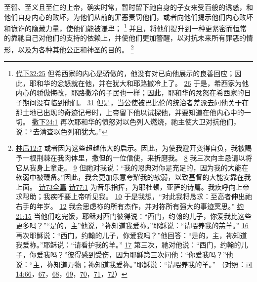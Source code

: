 \documentclass[12pt, a4paper, oneside]{ctexart}
\newcounter{parnum}[section]
\newcommand{\N}{%
   \noindent\refstepcounter{parnum}%
    \makebox[\parindent][l]{\textbf{\arabic{parnum}.}}}
\begin{document}
\N 至智、至义且至仁的上帝，确实时常，暂时留下祂自身的子女来受百般的诱惑，和他们自身内心的败坏，为他们从前的罪恶责罚他们，或者向他们揭示他们内心败坏和诡诈的隐藏力量，使他们能被谦卑；
	\footnote {
		\href{https://biblehub.com/2_chronicles/32-25.htm}{代下32:25} 但希西家的内心是骄傲的，他没有对已向他展示的良善回应；因此，耶和华的忿怒就在他，并在犹大和耶路撒冷上了。
		\href{https://biblehub.com/2_chronicles/32-26.htm}{26} 于是，希西家为他内心的骄傲悔改，耶路撒冷的子民也一样；因此，耶和华的忿怒在希西家的日子期间没有临到他们。
		\href{https://biblehub.com/2_chronicles/32-31.htm}{31} 但是，当公使被巴比伦的统治者差派去问他关于在那土地已出现的奇迹记号时，上帝留下他以试探他，并要知道在他内心中的一切。
		\href{https://biblehub.com/2_samuel/24-1.htm}{撒下24:1} 再次耶和华的愤怒对以色列人燃烧，祂主使大卫对抗他们，说：“去清查以色列和犹大。”
	}
	并且，将他们提升到一种更紧密而恒常的靠祂自己对他们的支持的依赖上，并使他们更加警醒，以对抗未来所有罪恶的情形，以及为各种其他公正和神圣的目的。
	\footnote {
		\href{https://biblehub.com/2_corinthians/12-7.htm}{林后12:7} 或者因为这些超越伟大的启示。因此，为使我避开变得自负，我被赐予一根荆棘在我肉体里，撒但的一位信使，来折磨我。
		\href{https://biblehub.com/2_corinthians/12-8.htm}{8} 我三次向主恳请以将它从我身上拿走。
		\href{https://biblehub.com/2_corinthians/12-9.htm}{9} 但祂对我说：“我的恩典对你是充足的，因为我的大能在软弱中被臻备。”因此，我会更加乐意夸耀我的软弱，以致基督的大能安靠在我上面。
		\href{https://biblehub.com/niv/psalms/73.htm}{诗73全篇}
		\href{https://biblehub.com/psalms/77-1.htm}{诗77:1} 为音乐指挥，为耶杜顿，亚萨的诗篇。我疾呼向上帝求帮助；我疾呼要上帝听见我。
		\href{https://biblehub.com/psalms/77-10.htm}{10} 于是我想，“对此我将恳求：至高者伸出祂右手的年岁。
		\href{https://biblehub.com/psalms/77-12.htm}{12} 我会思虑祢的所有杰作，并对祢所有强大的事迹冥思。”
		\href{https://biblehub.com/john/21-15.htm}{约21:15} 当他们吃完饭，耶稣对西门彼得说：“西门，约翰的儿子，你爱我比这些更多吗？”“是的，主”他说，“祢知道我爱祢。”耶稣说：“请喂养我的羔羊。”
		\href{https://biblehub.com/john/21-16.htm}{16} 再次耶稣说：“西门，约翰的儿子，你爱我吗？”他回答：“是的，主，祢知道我爱祢。”耶稣说：“请看护我的羊。”
		\href{https://biblehub.com/john/21-17.htm}{17} 第三次，祂对他说：“西门，约翰的儿子，你爱我吗？”彼得感到受伤，因为耶稣第三次问他：“你爱我吗？”他说：“主，祢知道万物；祢知道我爱祢。”耶稣说：“请喂养我的羊。”
		 （对照：\href{https://biblehub.com/mark/14-66.htm}{可14:66}，\href{https://biblehub.com/mark/14-67.htm}{67}，\href{https://biblehub.com/mark/14-68.htm}{68}，\href{https://biblehub.com/mark/14-69.htm}{69}，\href{https://biblehub.com/mark/14-70.htm}{70}，\href{https://biblehub.com/mark/14-71.htm}{71}，\href{https://biblehub.com/mark/14-72.htm}{72}）
	}
\end{document}
